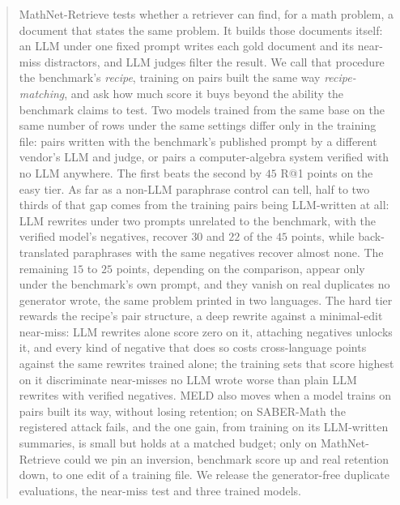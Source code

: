 \begin{abstract}
MathNet-Retrieve tests whether a retriever can find, for a math problem, a document that states the same problem. It builds those documents itself: an LLM under one fixed prompt writes each gold document and its near-miss distractors, and LLM judges filter the result. We call that procedure the benchmark's \emph{recipe}, training on pairs built the same way \emph{recipe-matching}, and ask how much score it buys beyond the ability the benchmark claims to test. Two models trained from the same base on the same number of rows under the same settings differ only in the training file: pairs written with the benchmark's published prompt by a different vendor's LLM and judge, or pairs a computer-algebra system verified with no LLM anywhere. The first beats the second by $45$ R@1 points on the easy tier. As far as a non-LLM paraphrase control can tell, half to two thirds of that gap comes from the training pairs being LLM-written at all: LLM rewrites under two prompts unrelated to the benchmark, with the verified model's negatives, recover $30$ and $22$ of the $45$ points, while back-translated paraphrases with the same negatives recover almost none. The remaining $15$ to $25$ points, depending on the comparison, appear only under the benchmark's own prompt, and they vanish on real duplicates no generator wrote, the same problem printed in two languages. The hard tier rewards the recipe's pair structure, a deep rewrite against a minimal-edit near-miss: LLM rewrites alone score zero on it, attaching negatives unlocks it, and every kind of negative that does so costs cross-language points against the same rewrites trained alone; the training sets that score highest on it discriminate near-misses no LLM wrote worse than plain LLM rewrites with verified negatives. MELD also moves when a model trains on pairs built its way, without losing retention; on SABER-Math the registered attack fails, and the one gain, from training on its LLM-written summaries, is small but holds at a matched budget; only on MathNet-Retrieve could we pin an inversion, benchmark score up and real retention down, to one edit of a training file. We release the generator-free duplicate evaluations, the near-miss test and three trained models\artifactsnote.
\end{abstract}
